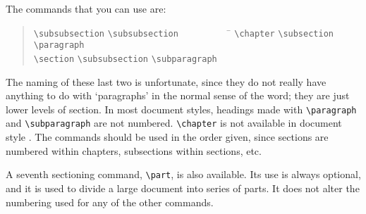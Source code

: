 The commands that you can use are:
\begin{quote}\begin{tabbing}
\verb|\subsubsection| \= \verb|\subsubsection|~~~~~~~~~~ \=           \kill
\verb|\chapter|       \> \verb|\subsection|    \> \verb|\paragraph|    \\
\verb|\section|       \> \verb|\subsubsection| \> \verb|\subparagraph| \\
\end{tabbing}\end{quote}
The naming of these last two is unfortunate, since they do not really have
anything to do with `paragraphs' in the normal sense of the word; they are just
lower levels of section.  In most document styles, headings made with
\verb|\paragraph| and \verb|\subparagraph| are not numbered.  \verb|\chapter|
is not available in document style .  The commands should be used
in the order given, since sections are numbered within chapters, subsections
within sections, etc.

A seventh sectioning command, \verb|\part|, is also available.  Its use is
always optional, and it is used to divide a large document into series of
parts.  It does not alter the numbering used for any of the other commands.

